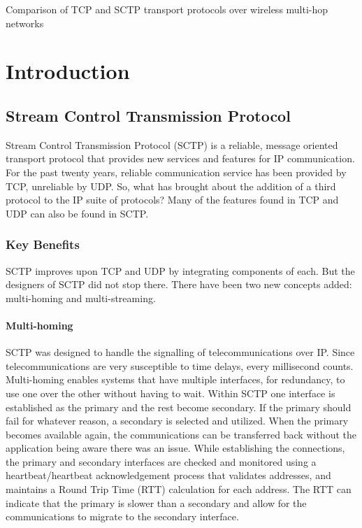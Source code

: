 \documentclass[a4paper]{article}
\begin{document}
 
 

\begin{center}
	\huge{Comparison of TCP and SCTP transport protocols over wireless multi-hop networks}
\end{center}

\section{Introduction}

\subsection{Stream Control Transmission Protocol}
Stream Control Transmission Protocol (SCTP) is a reliable, message oriented transport protocol that provides new services and features for IP communication. For the past twenty years, reliable communication service has been provided by TCP, unreliable by UDP. So, what has brought about the addition of a third protocol to the IP suite of protocols? Many of the features found in TCP and UDP can also be found in SCTP.

\subsubsection{Key Benefits}
SCTP improves upon TCP and UDP by integrating components of each. But the designers of SCTP did not stop there. There have been two new concepts added: multi-homing and multi-streaming.

\paragraph{Multi-homing}
SCTP was designed to handle the signalling of telecommunications over IP. Since  telecommunications are very susceptible to time delays, every millisecond counts. Multi-homing enables systems that have multiple interfaces, for redundancy, to use one over the other without having to wait. Within SCTP one interface is established as the primary and the rest become secondary. If the primary should fail for whatever reason, a secondary is selected and utilized. When the primary becomes available again, the communications can be transferred back without the application being aware there was an issue. While establishing the connections, the primary and secondary interfaces are checked and monitored using a heartbeat/heartbeat  acknowledgement process that validates addresses, and maintains a Round Trip Time (RTT) calculation for each address. The RTT can indicate that the primary is slower than a secondary and allow for the communications to migrate to the secondary interface.
\end{document}

